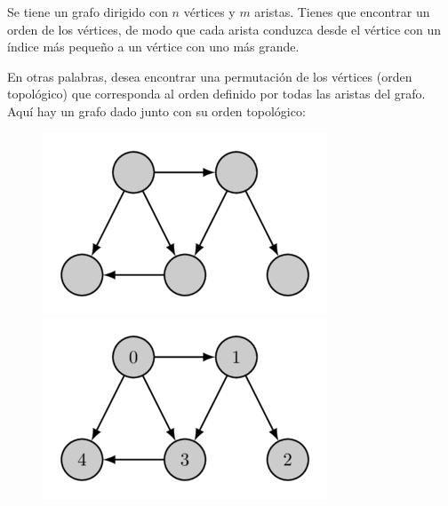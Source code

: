 Se tiene un grafo dirigido con $n$ vértices y $m$ aristas. Tienes que encontrar un orden de los vértices, 
de modo que cada arista conduzca desde el vértice con un índice más pequeño a un vértice con uno más 
grande.

En otras palabras, desea encontrar una permutación de los vértices (orden topológico) que corresponda al orden definido por todas las aristas del grafo. Aquí hay un grafo dado junto con su orden topológico:

\begin{figure}[h!]
	\centering
	\includegraphics[width=0.35\linewidth]{img/topological_1}
	\includegraphics[width=0.35\linewidth]{img/topological_2}
	\label{fig:topological1}
\end{figure}
